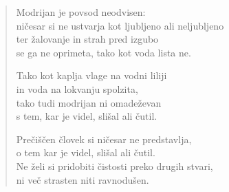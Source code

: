 \begin{verse}
Modrijan je povsod neodvisen:\\
ničesar si ne ustvarja kot ljubljeno ali neljubljeno\\
ter žalovanje in strah pred izgubo\\
se ga ne oprimeta, tako kot voda lista ne.

Tako kot kaplja vlage na vodni liliji\\
in voda na lokvanju spolzita,\\
tako tudi modrijan ni omadeževan\\
s tem, kar je videl, slišal ali čutil.

Prečiščen človek si ničesar ne predstavlja,\\
o tem kar je videl, slišal ali čutil.\\
Ne želi si pridobiti čistosti preko drugih stvari,\\
ni več strasten niti ravnodušen.

\end{verse}


\clearpage
\begin{verse}


\end{verse}


\clearpage
\begin{verse}


\end{verse}

